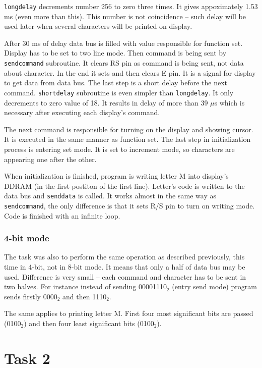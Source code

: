 \documentclass{article}
\begin{document}
\texttt{long\textunderscore delay} decrements number 256 to zero three times. It gives
appoximately 1.53 ms (even more than this). This number is not coincidence -- such delay
will be used later when several characters will be printed on display.

After 30 ms of delay data bus is filled with value responsible for function set. 
Display has to be set to two line mode. Then command is being sent by \texttt{send\textunderscore command}
subroutine. It clears RS pin as command is being sent, not data about character. In the end
it sets and then clears E pin. It is a signal for display to get data from data bus. The last
step is a short delay before the next command. \texttt{short\textunderscore delay} subroutine
is even simpler than \texttt{long\textunderscore delay}. It only decrements to zero value of 18.
It results in delay of more than 39 $\mu$s which is necessary after executing each display's command.

The next command is responsible for turning on the display and showing cursor. It is executed
in the same manner as function set. The last step in initialization process is entering
set mode. It is set to increment mode, so characters are appearing one after the other.

When initialization is finished, program is writing letter M into display's DDRAM (in the first postiton of the first line).
Letter's code is written to the data bus and \texttt{send\textunderscore data} is called.
It works almost in the same way as \texttt{send\textunderscore command}, the only difference is that
it sets R/S pin to turn on writing mode. Code is finished with an infinite loop.

\subsubsection{4-bit mode}
The task was also to perform the same operation as described previously, this time in 4-bit,
not in 8-bit mode. It means that only a half of data bus may be used. Difference is very
small -- each command and character has to be sent in two halves. For instance
instead of sending 00001110$_2$ (entry send mode) program sends firstly 0000$_2$ and then 1110$_2$.

The same applies to printing letter M. First four most significant bits are passed
(0100$_2$) and then four least significant bits (0100$_2$).

\newpage

\section{Task 2}
\end{document}
